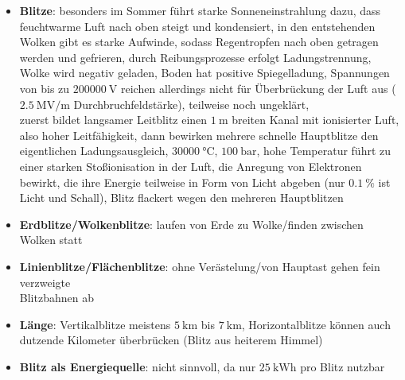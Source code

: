 \pagebreak
\begin{itemize}
    \item
    \textbf{Blitze}:
    besonders im Sommer führt starke Sonneneinstrahlung dazu, dass
    feuchtwarme Luft nach oben steigt und kondensiert,
    in den entstehenden Wolken gibt es starke Aufwinde, sodass Regentropfen
    nach oben getragen werden und gefrieren, durch Reibungsprozesse erfolgt
    Ladungstrennung, Wolke wird negativ geladen, Boden hat positive
    Spiegelladung,
    Spannungen von bis zu $\SI{200000}{\volt}$ reichen allerdings nicht für
    Überbrückung der Luft aus ($\SI{2.5}{\mega\volt\per\meter}$
    Durchbruchfeldstärke),
    teilweise noch ungeklärt, \\
    zuerst bildet langsamer Leitblitz einen $\SI{1}{\meter}$ breiten Kanal
    mit ionisierter Luft, also hoher Leitfähigkeit, dann bewirken mehrere
    schnelle Hauptblitze den eigentlichen Ladungsausgleich,
    $\SI{30000}{\celsius}$, $\SI{100}{\bar}$,
    hohe Temperatur führt zu einer starken Stoßionisation in der Luft,
    die Anregung von Elektronen bewirkt, die ihre Energie teilweise in Form
    von Licht abgeben (nur $\SI{0.1}{\percent}$ ist Licht und Schall),
    Blitz flackert wegen den mehreren Hauptblitzen
    
    \item
    \textbf{Erdblitze/Wolkenblitze}:
    laufen von Erde zu Wolke/finden zwischen Wolken statt
    
    \item
    \textbf{Linienblitze/Flächenblitze}:
    ohne Verästelung/von Hauptast gehen fein verzweigte\\
    Blitzbahnen ab
    
    \item
    \textbf{Länge}:
    Vertikalblitze meistens $\SI{5}{\kilo\meter}$ bis $\SI{7}{\kilo\meter}$, 
    Horizontalblitze können auch dutzende Kilometer überbrücken
    (Blitz aus heiterem Himmel)
    
    \item
    \textbf{Blitz als Energiequelle}:
    nicht sinnvoll, da nur $\SI{25}{\kilo\watt\hour}$ pro Blitz nutzbar
\end{itemize}
\linie
